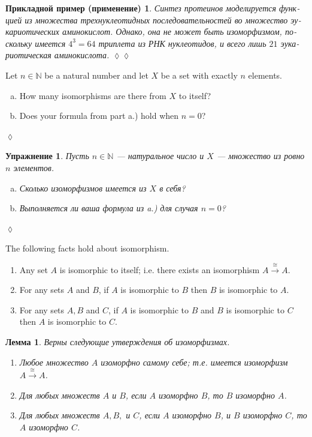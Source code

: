 \documentclass[a4paper]{book}
\def\NN{{\mathbb N}}
\def\iso{\cong}
\newcommand{\To}[1]{\xrightarrow{#1}}
\theoremstyle{myth}
\newtheorem{lemmaENG}[envENG]{\begin{english}Lemma\end{english}}
\newtheorem{excENG}[envENG]{\begin{english}Exercise\end{english}}
\newenvironment{exerciseENG}{\begin{excENG}}{\hspace*{\fill}$\lozenge$\end{excENG}}
\newtheorem{lemmaRUS}[envRUS]{Лемма}
\newtheorem{excRUS}[envRUS]{Упражнение}
\newtheorem{appRUS}[envRUS]{Прикладной пример (применение)}
\newenvironment{exerciseRUS}{\begin{excRUS}}{\hspace*{\fill}$\lozenge$\end{excRUS}}
\newenvironment{applicationRUS}{\begin{appRUS}}{\hspace*{\fill}$\lozenge\lozenge$\end{appRUS}}
\def\sexc{\begin{enumerate}[a.)]\setlength{\itemsep}{.1cm}\setlength{\parskip}{.1cm}\item}
\def\next{\item}
\def\endsexc{\end{enumerate}}
\begin{document}
\begin{russian}
\begin{applicationRUS}
Синтез протеинов моделируется функцией из множества трехнуклеотидных последовательностей во множество эукариотических аминокислот. Однако, она не может быть изоморфизмом, поскольку имеется $4^3=64$ триплета из РНК нуклеотидов, и всего лишь $21$ эукариотическая аминокислота. 
\end{applicationRUS}

\begin{exerciseENG}
Let $n\in\NN$ be a natural number and let $X$ be a set with exactly $n$ elements. 
\sexc How many isomorphisms are there from $X$ to itself? 
\next Does your formula from part a.) hold when $n=0$?
\endsexc
\end{exerciseENG}

\begin{exerciseRUS}
Пусть $n\in\NN$ — натуральное число и $X$ — множество из ровно $n$ элементов. 
\sexc Сколько изоморфизмов имеется из $X$ в себя? 
\next Выполняется ли ваша формула из a.) для случая $n=0$?
\endsexc 
\end{exerciseRUS}

\begin{lemmaENG}\label{lemma:isomorphic ER in Set}
The following facts hold about isomorphism.
\begin{enumerate}
\item Any set $A$ is isomorphic to itself; i.e. there exists an isomorphism $A\To{\iso} A$.
\item For any sets $A$ and $B$, if $A$ is isomorphic to $B$ then $B$ is isomorphic to $A$.
\item For any sets $A, B$ and $C$, if $A$ is isomorphic to $B$ and $B$ is isomorphic to $C$ then $A$ is isomorphic to $C$.
\end{enumerate}
\end{lemmaENG}

\begin{lemmaRUS}\label{lemma:isomorphic ER in Set}
Верны следующие утверждения об изоморфизмах.
\begin{enumerate}
\item Любое множество $A$ изоморфно самому себе; т.е. имеется изоморфизм $A\To{\iso} A$.
\item Для любых множеств $A$ и $B$, если $A$ изоморфно $B$, то $B$ изоморфно $A$.
\item Для любых множеств $A, B,$ и $C$, если $A$ изоморфно $B$, и $B$ изоморфно $C$, то $A$ изоморфно $C$.
\end{enumerate}
\end{lemmaRUS}


\end{russian}
\end{document}
